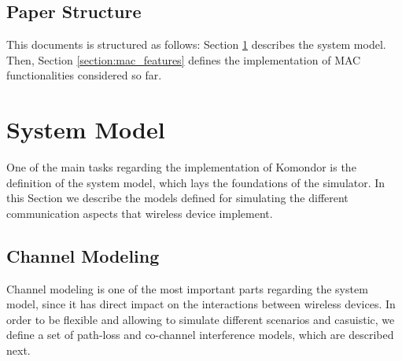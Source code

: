 \documentclass[a4paper]{article}
\begin{document}
	\subsection{Paper Structure}
	\label{section:structure}
	This documents is structured as follows: Section \ref{section:system_model} describes the system model. Then, Section \ref{section:mac_features} defines the implementation of MAC functionalities considered so far.
	
\section{System Model}
\label{section:system_model}
One of the main tasks regarding the implementation of Komondor is the definition of the system model, which lays the foundations of the simulator. In this Section we describe the models defined for simulating the different communication aspects that wireless device implement.
	
	\subsection{Channel Modeling}
	Channel modeling is one of the most important parts regarding the system model, since it has direct impact on the interactions between wireless devices. In order to be flexible and allowing to simulate different scenarios and casuistic, we define a set of path-loss and co-channel interference models, which are described next.
	
\end{document}
